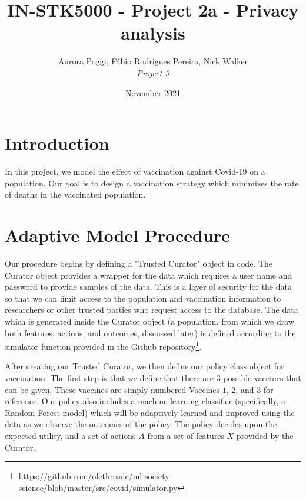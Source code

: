 \documentclass{article}
\title{IN-STK5000 - Project 2a - Privacy analysis}
\author{Aurora Poggi, Fábio Rodrigues Pereira, Nick Walker \\
\emph{Project 9}}
\date{November 2021}
\begin{document}
\maketitle

\section{Introduction}
In this project, we model the effect of vaccination against Covid-19 on a population. Our goal is to design a vaccination strategy which minimizes the rate of deaths in the vaccinated population. 

\section{Adaptive Model Procedure}
\label{adaptive_procedure}

Our procedure begins by defining a "Trusted Curator" object in code. The Curator object provides a wrapper for the data which requires a user name and password to provide samples of the data. This is a layer of security for the data so that we can limit access to the population and vaccination information to researchers or other trusted parties who request access to the database. The data which is generated inside the Curator object (a population, from which we draw both features, actions, and outcomes, discussed later) is defined according to the simulator function provided in the Github repository\footnote{https://github.com/olethrosdc/ml-society-science/blob/master/src/covid/simulator.py}. 

After creating our Trusted Curator, we then define our policy class object for vaccination. The first step is that we define that there are $3$ possible vaccines that can be given. These vaccines are simply numbered Vaccines $1$, $2$, and $3$ for reference. Our policy also includes a machine learning classifier (specifically, a Random Forest model) which will be adaptively learned and improved using the data as we observe the outcomes of the policy. The policy decides upon the expected utility, and a set of actions $A$ from a set of features $X$ provided by the Curator.
\end{document}

